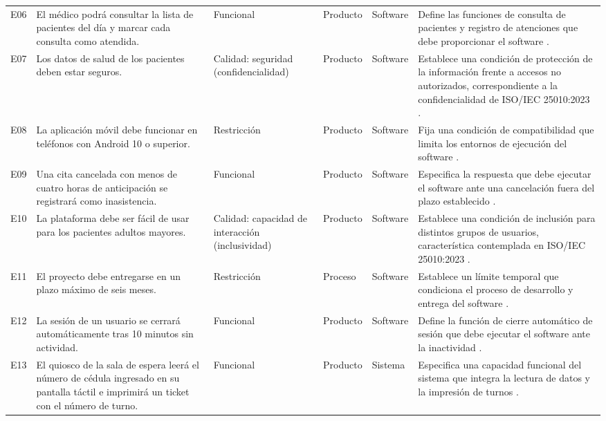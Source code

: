 \documentclass[12pt,a4paper,oneside]{article}
\begin{document}
\begin{longtable}{
    C{1.25cm}
    L{3.5cm}
    L{2.2cm}
    C{1.7cm}
    C{1.35cm}
    L{4.5cm}
}
E06 &
El médico podrá consultar la lista de pacientes del día y
marcar cada consulta como atendida. &
Funcional &
Producto &
Software &
Define las funciones de consulta de pacientes y registro
de atenciones que debe proporcionar el software
\cite{ieee29148}. \\

E07 &
Los datos de salud de los pacientes deben estar seguros. &
Calidad: seguridad (confidencialidad) &
Producto &
Software &
Establece una condición de protección de la información
frente a accesos no autorizados, correspondiente a la
confidencialidad de ISO/IEC 25010:2023 \cite{iso25010}. \\

E08 &
La aplicación móvil debe funcionar en teléfonos con Android
10 o superior. &
Restricción &
Producto &
Software &
Fija una condición de compatibilidad que limita los entornos
de ejecución del software \cite{ieee29148}. \\

E09 &
Una cita cancelada con menos de cuatro horas de anticipación
se registrará como inasistencia. &
Funcional &
Producto &
Software &
Especifica la respuesta que debe ejecutar el software
ante una cancelación fuera del plazo establecido
\cite{ieee29148}. \\

E10 &
La plataforma debe ser fácil de usar para los pacientes
adultos mayores. &
Calidad: capacidad de interacción
(inclusividad) &
Producto &
Software &
Establece una condición de inclusión para distintos grupos
de usuarios, característica contemplada en
ISO/IEC 25010:2023 \cite{iso25010}. \\

E11 &
El proyecto debe entregarse en un plazo máximo de seis meses. &
Restricción &
Proceso &
Software &
Establece un límite temporal que condiciona el proceso
de desarrollo y entrega del software \cite{ieee29148}. \\

E12 &
La sesión de un usuario se cerrará automáticamente tras
10 minutos sin actividad. &
Funcional &
Producto &
Software &
Define la función de cierre automático de sesión que
debe ejecutar el software ante la inactividad
\cite{ieee29148}. \\

E13 &
El quiosco de la sala de espera leerá el número de cédula
ingresado en su pantalla táctil e imprimirá un ticket con
el número de turno. &
Funcional &
Producto &
Sistema &
Especifica una capacidad funcional del sistema que integra
la lectura de datos y la impresión de turnos
\cite{ieee29148}. \\


\end{longtable}
\end{document}
